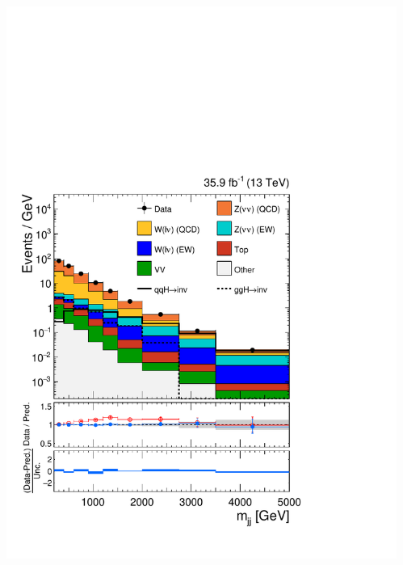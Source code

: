 \documentclass[aspectratio=169,xcolor=dvipsnames,,table,compress]{beamer}
\begin{document}
\begin{frame}
\begin{columns}
\begin{column}{0.33\textwidth}
    \end{column}
    \begin{column}{0.33\textwidth}
      \centering
      \includegraphics[width=\textwidth]{../figures/vbf/fits/vbf_PULLS_prefit_postfit_signal.pdf}
    \end{column}
  \end{columns}
\end{frame}
\end{document}
